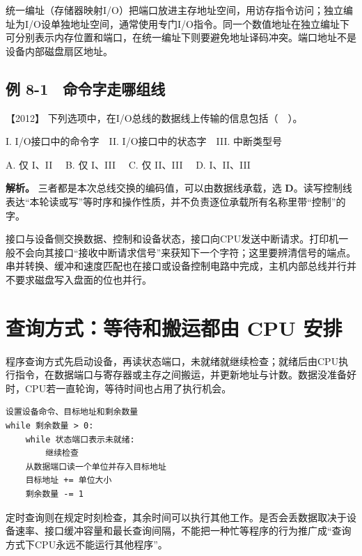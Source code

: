 统一编址（存储器映射I/O）把端口放进主存地址空间，用访存指令访问；独立编址为I/O设单独地址空间，通常使用专门I/O指令。同一个数值地址在独立编址下可分别表示内存位置和端口，在统一编址下则要避免地址译码冲突。端口地址不是设备内部磁盘扇区地址。

\subsection{例 8-1　命令字走哪组线}\label{co-ex8-1}

\noindent{}【2012】 下列选项中，在I/O总线的数据线上传输的信息包括（　）。

I. I/O接口中的命令字　II. I/O接口中的状态字　III. 中断类型号

A. 仅 I、II　 B. 仅 I、III　 C. 仅 II、III　 D. I、II、III


\textbf{解析。} 三者都是本次总线交换的编码值，可以由数据线承载，选 \textbf{D}。读写控制线表达``本轮读或写''等时序和操作性质，并不负责逐位承载所有名称里带``控制''的字。

接口与设备侧交换数据、控制和设备状态，接口向CPU发送中断请求。打印机一般不会向其接口``接收中断请求信号''来获知下一个字符；这里要辨清信号的端点。串并转换、缓冲和速度匹配也在接口或设备控制电路中完成，主机内部总线并行并不要求磁盘写入盘面的位也并行。

\section{查询方式：等待和搬运都由 CPU 安排}\label{co-08-02}

程序查询方式先启动设备，再读状态端口，未就绪就继续检查；就绪后由CPU执行指令，在数据端口与寄存器或主存之间搬运，并更新地址与计数。数据没准备好时，CPU若一直轮询，等待时间也占用了执行机会。

\par\medskip\noindent
\begin{minipage}{\linewidth}
\begin{verbatim}
设置设备命令、目标地址和剩余数量
while 剩余数量 > 0:
    while 状态端口表示未就绪:
        继续检查
    从数据端口读一个单位并存入目标地址
    目标地址 += 单位大小
    剩余数量 -= 1
\end{verbatim}
\end{minipage}\par\medskip

定时查询则在规定时刻检查，其余时间可以执行其他工作。是否会丢数据取决于设备速率、接口缓冲容量和最长查询间隔，不能把一种忙等程序的行为推广成``查询方式下CPU永远不能运行其他程序''。

